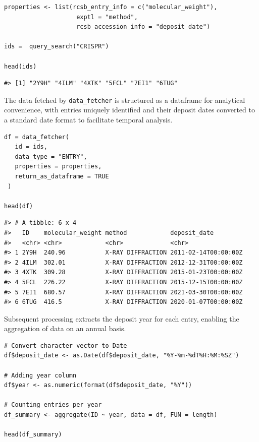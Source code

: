 \begin{verbatim}
properties <- list(rcsb_entry_info = c("molecular_weight"),
                    exptl = "method",
                    rcsb_accession_info = "deposit_date")

ids =  query_search("CRISPR")

head(ids)
\end{verbatim}

\begin{verbatim}
#> [1] "2Y9H" "4ILM" "4XTK" "5FCL" "7EI1" "6TUG"
\end{verbatim}

The data fetched by \texttt{data\_fetcher} is structured as a dataframe for analytical convenience, with entries uniquely identified and their deposit dates converted to a standard date format to facilitate temporal analysis.

\begin{verbatim}
df = data_fetcher(
   id = ids,
   data_type = "ENTRY",
   properties = properties,
   return_as_dataframe = TRUE
 )

head(df)
\end{verbatim}

\begin{verbatim}
#> # A tibble: 6 x 4
#>   ID    molecular_weight method            deposit_date        
#>   <chr> <chr>            <chr>             <chr>               
#> 1 2Y9H  240.96           X-RAY DIFFRACTION 2011-02-14T00:00:00Z
#> 2 4ILM  302.01           X-RAY DIFFRACTION 2012-12-31T00:00:00Z
#> 3 4XTK  309.28           X-RAY DIFFRACTION 2015-01-23T00:00:00Z
#> 4 5FCL  226.22           X-RAY DIFFRACTION 2015-12-15T00:00:00Z
#> 5 7EI1  680.57           X-RAY DIFFRACTION 2021-03-30T00:00:00Z
#> 6 6TUG  416.5            X-RAY DIFFRACTION 2020-01-07T00:00:00Z
\end{verbatim}

Subsequent processing extracts the deposit year for each entry, enabling the aggregation of data on an annual basis.

\begin{verbatim}
# Convert character vector to Date
df$deposit_date <- as.Date(df$deposit_date, "%Y-%m-%dT%H:%M:%SZ")

# Adding year column
df$year <- as.numeric(format(df$deposit_date, "%Y"))

# Counting entries per year
df_summary <- aggregate(ID ~ year, data = df, FUN = length)

head(df_summary)
\end{verbatim}

